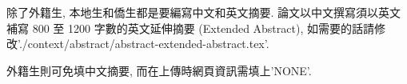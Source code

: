 \StartAbstractChi

除了外籍生, 本地生和僑生都是要編寫中文和英文摘要. 論文以中文撰寫須以英文補寫 800 至 1200 字數的英文延伸摘要 (Extended Abstract), 如需要的話請修改'./context/abstract/abstract-extended-abstract.tex'.

外籍生則可免填中文摘要, 而在上傳時網頁資訊需填上'NONE'.

\EndAbstractChi
